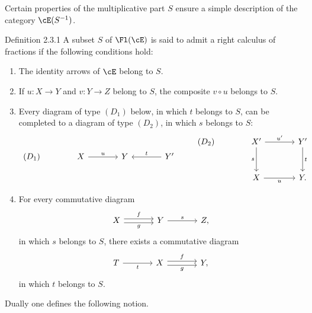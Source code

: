 Certain properties of the multiplicative part $S$ ensure a simple description of the category $\cE(S^{-1})$.

\begin{statement}{Definition 2.3.1}
A subset $S$ of $\Fl(\cE)$ is said to admit a right calculus of fractions if the following conditions hold:
\begin{enumerate}[label=(\alph*)]
\item The identity arrows of $\cE$ belong to $S$.
\item If $u:X\to Y$ and $v:Y\to Z$ belong to $S$, the composite $v\circ u$ belongs to $S$.
\item Every diagram of type $(D_1)$ below, in which $t$ belongs to $S$, can be completed to a diagram of type $(D_2)$, in which $s$ belongs to $S$:
\[
\begin{tikzcd}[column sep=large]
(D_1)& X \arrow[r,"u"] & Y & Y' \arrow[l,"t"']
\end{tikzcd}
\qquad
\begin{tikzcd}[column sep=large,row sep=large]
(D_2)& X' \arrow[r,"u'"] \arrow[d,"s"'] & Y' \arrow[d,"t"]\\
& X \arrow[r,"u"'] & Y .
\end{tikzcd}
\]
\item For every commutative diagram
\[
\begin{tikzcd}[column sep=large]
X \arrow[r,shift left,"f"] \arrow[r,shift right,"g"'] & Y \arrow[r,"s"] & Z,
\end{tikzcd}
\]
in which $s$ belongs to $S$, there exists a commutative diagram
\[
\begin{tikzcd}[column sep=large]
T \arrow[r,"t"'] & X \arrow[r,shift left,"f"] \arrow[r,shift right,"g"'] & Y,
\end{tikzcd}
\]
in which $t$ belongs to $S$.
\end{enumerate}
\end{statement}

Dually one defines the following notion.

